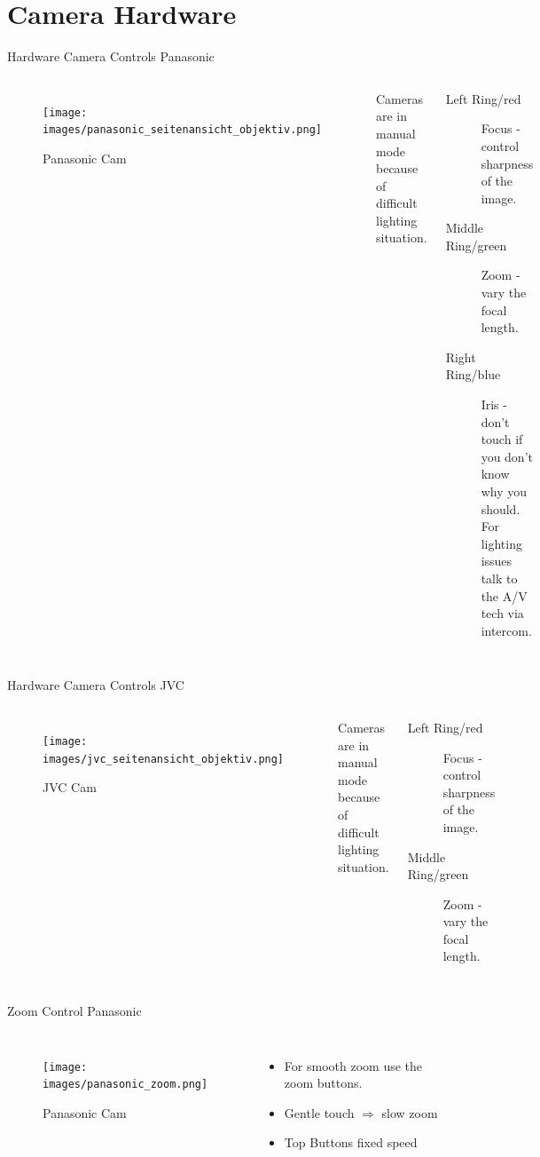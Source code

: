 \documentclass[aspectratio=169]{beamer}
\begin{document}
\section{Camera Hardware}
\begin{frame}{Hardware Camera Controls Panasonic}
	\begin{columns}[T,onlytextwidth]
	\begin{figure} 
		\centering
		\texttt{[image: images/panasonic\_seitenansicht\_objektiv.png]}
		\caption{Panasonic Cam}
	\end{figure}
		Cameras are in manual mode because of difficult lighting situation.
		\begin{description}
			\item[Left Ring/red] Focus - control sharpness of the image.
			\item[Middle Ring/green] Zoom - vary the focal length.
			\item[Right Ring/blue] Iris - don't touch if you don't know why you should. For lighting issues talk to the A/V tech via intercom.%
		\end{description}
	\end{columns}
\end{frame}

\begin{frame}{Hardware Camera Controls JVC}
	\begin{columns}[T,onlytextwidth]
	\begin{figure} 
		\centering
		\texttt{[image: images/jvc\_seitenansicht\_objektiv.png]}
		\caption{JVC Cam}
	\end{figure}
		Cameras are in manual mode because of difficult lighting situation.
		\begin{description}
			\item[Left Ring/red] Focus - control sharpness of the image.
			\item[Middle Ring/green] Zoom - vary the focal length.
		\end{description}
	\end{columns}
\end{frame}

\begin{frame}{Zoom Control Panasonic}
	\begin{columns}[T,onlytextwidth]
	\begin{figure} 
		\centering
		\texttt{[image: images/panasonic\_zoom.png]}
		\caption{Panasonic Cam}
	\end{figure}
		\begin{itemize}
			\item For smooth zoom use the zoom buttons.
			\item Gentle touch $\Rightarrow$ slow zoom
			\item Top Buttons fixed speed
		\end{itemize}
	\end{columns}
\end{frame}
\end{document}
